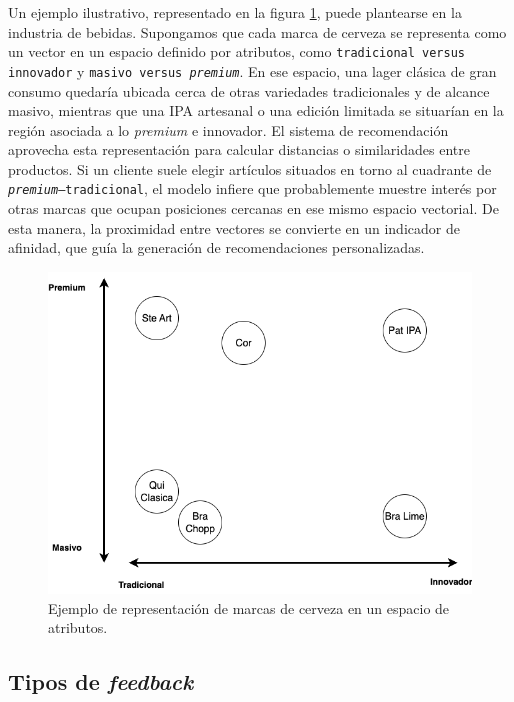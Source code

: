 Un ejemplo ilustrativo, representado en la figura \ref{fig:ejemploSimilitud}, puede plantearse en la industria de bebidas. Supongamos que cada marca de cerveza se representa como un vector en un espacio definido por atributos, como \texttt{tradicional versus innovador} y \texttt{masivo versus \textit{premium}}. En ese espacio, una lager clásica de gran consumo quedaría ubicada cerca de otras variedades tradicionales y de alcance masivo, mientras que una IPA artesanal o una edición limitada se situarían en la región asociada a lo \textit{premium} e innovador. El sistema de recomendación aprovecha esta representación para calcular distancias o similaridades entre productos. Si un cliente suele elegir artículos situados en torno al cuadrante de \texttt{\textit{premium}–tradicional}, el modelo infiere que probablemente muestre interés por otras marcas que ocupan posiciones cercanas en ese mismo espacio vectorial. De esta manera, la proximidad entre vectores se convierte en un indicador de afinidad, que guía la generación de recomendaciones personalizadas.

\begin{figure}[htpb]
	\centering
	\includegraphics[scale=.4]{./Figures/ejemploSimilitud.png}
	\caption{Ejemplo de representación de marcas de cerveza en un espacio de atributos.}
	\label{fig:ejemploSimilitud}
\end{figure}

\subsection{Tipos de \textit{feedback}}

